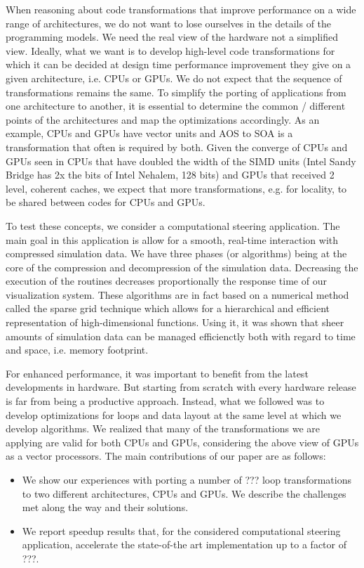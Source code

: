 When reasoning about code transformations that improve performance on a wide range of architectures, we do not want to lose ourselves in the details of the programming models. We need the real view of the hardware not a simplified view. Ideally, what we want is to develop high-level code transformations for which it can be decided at design time performance improvement they give on a given architecture, i.e. CPUs or GPUs. We do not expect that the sequence of transformations remains the same. To simplify the porting of applications from one architecture to another, it is essential to determine the common / different points of the architectures and map the optimizations accordingly. As an example, CPUs and GPUs have vector units and AOS to SOA is a transformation that often is required by both. Given the converge of CPUs and GPUs seen in CPUs that have doubled the width of the SIMD units (Intel Sandy Bridge has 2x the bits of Intel Nehalem, 128 bits) and GPUs that received 2 level, coherent caches, we expect that more transformations, e.g. for locality, to be shared between codes for CPUs and GPUs.

To test these concepts, we consider a computational steering application. The main goal in this application is allow for a smooth, real-time interaction with compressed simulation data. We have three phases (or algorithms) being at the core of the compression and decompression of the simulation data. Decreasing the execution of the routines decreases proportionally the response time of our visualization system. These algorithms are in fact based on a numerical method called the sparse grid technique which allows for a hierarchical and efficient representation of high-dimensional functions. Using it, it was shown that sheer amounts of simulation data can be managed efficienctly both with regard to time and space, i.e. memory footprint.

For enhanced performance, it was important to benefit from the latest developments in hardware. But starting from scratch with every hardware release is far from being a productive approach. Instead, what we followed was to develop optimizations for loops and data layout at the same level at which we develop algorithms. We realized that many of the transformations we are applying are valid for both CPUs and GPUs, considering the above view of GPUs as a vector processors. The main contributions of our paper are as follows:

\begin{itemize}
    \item We show our experiences with porting a number of ??? loop transformations to two different architectures, CPUs and GPUs. We describe the challenges met along the way and their solutions.
    \item We report speedup results that, for the considered computational steering application, accelerate the state-of-the art implementation up to a factor of ???.
\end{itemize}


